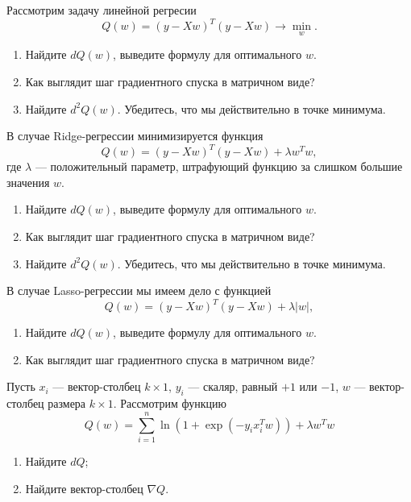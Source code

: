 \documentclass[12pt, a4paper, oneside]{article}
\theoremstyle{plain} %
\theoremstyle{definition}
\begin{document}
\begin{problem}{}
	Рассмотрим задачу линейной регресии
	\[
	Q(w) = (y - Xw)^T(y - Xw) \to \min_{w}.
	\]
	
	\begin{enumerate}
		\item Найдите $dQ(w)$, выведите формулу для оптимального $w$.
		\item Как выглядит шаг градиентного спуска в матричном виде?
		\item Найдите $d^2Q(w)$. Убедитесь, что мы действительно в точке минимума. 
	\end{enumerate}
\end{problem}

\begin{problem}{}
	В случае Ridge-регрессии минимизируется функция
	\[
	Q(w) = (y - Xw)^T(y - Xw) + \lambda w^T w,
	\]
	где $\lambda$ — положительный параметр, штрафующий функцию за слишком большие значения $w$.
	
	\begin{enumerate}
		\item Найдите $dQ(w)$, выведите формулу для оптимального $w$.
		\item Как выглядит шаг градиентного спуска в матричном виде?
		\item Найдите $d^2Q(w)$. Убедитесь, что мы действительно в точке минимума. 
	\end{enumerate}
	
	В случае Lasso-регрессии мы имеем дело с функцией
	\[
	Q(w) = (y - Xw)^T(y - Xw) + \lambda |w|,
	\]
	
	\begin{enumerate}
		\item Найдите $dQ(w)$, выведите формулу для оптимального $w$.
		\item Как выглядит шаг градиентного спуска в матричном виде?
	\end{enumerate}
\end{problem}

\begin{problem}{}
	
	Пусть $x_i$ — вектор-столбец $k\times 1$, $y_i$ — скаляр, равный $+1$ или $-1$, $w$ — вектор-столбец размера $k\times 1$. Рассмотрим функцию
	\[
	Q(w) = \sum_{i=1}^n \ln (1 + \exp(-y_ix_i^Tw)) + \lambda w^T w
	\]
	
	\begin{enumerate}
		\item Найдите $dQ$;
		\item Найдите вектор-столбец $\nabla Q$.
	\end{enumerate}
\end{problem}
\end{document}
